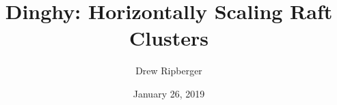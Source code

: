 \documentclass[11pt, twocolumn]{article}
\title{Dinghy: Horizontally Scaling Raft Clusters}
\author{Drew Ripberger}
\date{January 26, 2019}
\begin{document}
  \maketitle
  \textbf{}
  
  
  
  
  
  
  
  
  
\end{document}
